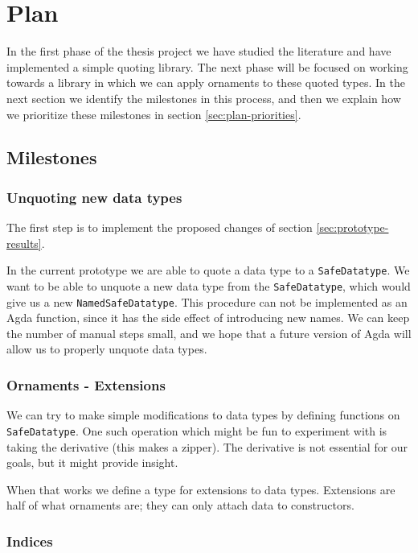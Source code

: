 \section{Plan}\label{sec:plan}

In the first phase of the thesis project we have studied the
literature and have implemented a simple quoting library.
The next phase will be focused on working towards a library in which
we can apply ornaments to these quoted types.
In the next section we identify the milestones in this process, and
then we explain how we prioritize these milestones in section
\ref{sec:plan-priorities}.

\subsection{Milestones}

\subsubsection{Unquoting new data types}\label{sec:plan-new-types}

The first step is to implement the proposed changes of section
\ref{sec:prototype-results}. 

In the current prototype we are able to quote a data type to a
\texttt{SafeDatatype}.
We want to be able to unquote a new data type from the
\texttt{SafeDatatype}, which would give us a new
\texttt{NamedSafeDatatype}.
This procedure can not be implemented as an Agda function, since it
has the side effect of introducing new names.
We can keep the number of manual steps small, and we hope that a
future version of Agda will allow us to properly unquote data types.

\subsubsection{Ornaments - Extensions}\label{sec:plan-extensions}

We can try to make simple modifications to data types by defining
functions on \texttt{SafeDatatype}.
One such operation which might be fun to experiment with is taking the
derivative (this makes a zipper).
The derivative is not essential for our goals, but it might provide insight.

When that works we define a type for extensions to data types.
Extensions are half of what ornaments are; they can only attach data
to constructors.

\subsubsection{Indices}\label{sec:plan-indices}

